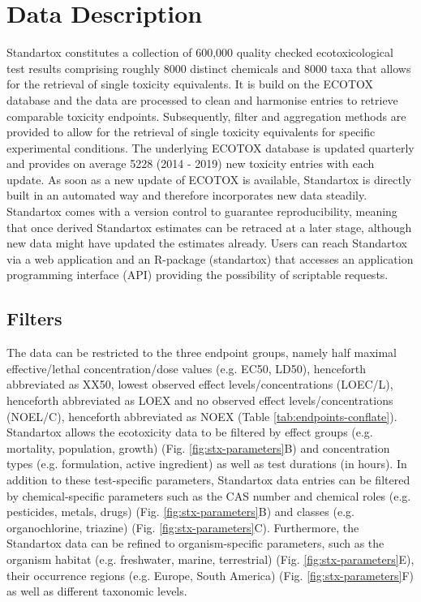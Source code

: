 \section{Data Description}
Standartox constitutes a collection of 600,000 quality checked ecotoxicological test results comprising roughly 8000 distinct chemicals and 8000 taxa that allows for the retrieval of single toxicity equivalents. It is build on the ECOTOX database \citep{usepa_ecotox_2019} and the data are processed to clean and harmonise entries to retrieve comparable toxicity endpoints. Subsequently, filter and aggregation methods are provided to allow for the retrieval of single toxicity equivalents for specific experimental conditions. The underlying ECOTOX database is updated quarterly and provides on average 5228 (2014 - 2019) new toxicity entries with each update. As soon as a new update of ECOTOX is available, Standartox is directly built in an automated way and therefore incorporates new data steadily. Standartox comes with a version control to guarantee reproducibility, meaning that once derived Standartox estimates can be retraced at a later stage, although new data might have updated the estimates already. Users can reach Standartox via a web application and an R-package (standartox) that accesses an application programming interface (API) providing the possibility of scriptable requests.

\subsection{Filters}
The data can be restricted to the three endpoint groups, namely half maximal effective/lethal concentration/dose values (e.g. EC50, LD50), henceforth abbreviated as XX50, lowest observed effect levels/concentrations (LOEC/L), henceforth abbreviated as LOEX and no observed effect levels/concentrations (NOEL/C), henceforth abbreviated as NOEX (Table \ref{tab:endpoints-conflate}). Standartox allows the ecotoxicity data to be filtered by effect groups (e.g. mortality, population, growth) (Fig. \ref{fig:stx-parameters}B) and concentration types (e.g. formulation, active ingredient) as well as test durations (in hours). In addition to these test-specific parameters, Standartox data entries can be filtered by chemical-specific parameters such as the CAS number and chemical roles (e.g. pesticides, metals, drugs) (Fig. \ref{fig:stx-parameters}B) and classes (e.g. organochlorine, triazine) (Fig. \ref{fig:stx-parameters}C). Furthermore, the Standartox data can be refined to organism-specific parameters, such as the organism habitat (e.g. freshwater, marine, terrestrial) (Fig. \ref{fig:stx-parameters}E), their occurrence regions (e.g. Europe, South America) (Fig. \ref{fig:stx-parameters}F) as well as different taxonomic levels.

